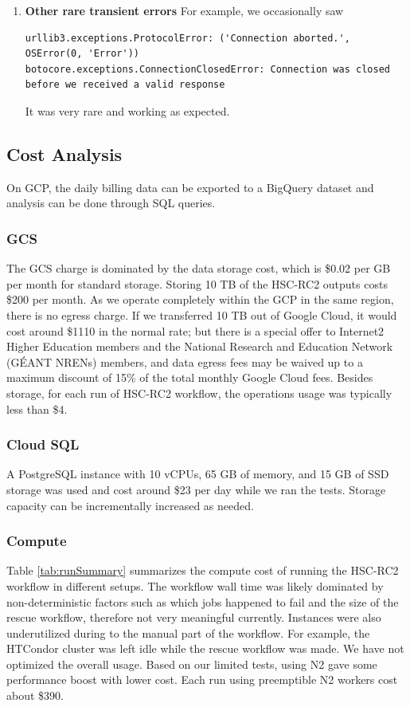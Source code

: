 \begin{enumerate}
\item  \textbf{Other rare transient errors}
For example, we occasionally saw
\begin{lstlisting}[style=basherror]
urllib3.exceptions.ProtocolError: ('Connection aborted.', OSError(0, 'Error'))
botocore.exceptions.ConnectionClosedError: Connection was closed before we received a valid response
\end{lstlisting}
It was very rare and working as expected.

\end{enumerate}


\subsection{Cost Analysis}
On GCP, the daily billing data can be exported to a BigQuery dataset and analysis can be done through SQL queries.

\subsubsection{GCS}
The GCS charge is dominated by the data storage cost, which is \$0.02 per GB per month for standard storage.
Storing 10 TB of the HSC-RC2 outputs costs \$200 per month.
As we operate completely within the GCP in the same region, there is no egress charge.
If we transferred 10 TB out of Google Cloud, it would cost around \$1110 in the normal rate; but there is a special offer to Internet2 Higher Education members and the National Research and Education Network (G\'{E}ANT NRENs) members, and data egress fees may be waived up to a maximum discount of 15\% of the total monthly Google Cloud fees.
Besides storage, for each run of HSC-RC2 workflow, the operations usage was typically less than \$4.

\subsubsection{Cloud SQL}
A PostgreSQL instance with 10 vCPUs, 65 GB of memory, and 15 GB of SSD storage was used and cost around \$23 per day while we ran the tests.
Storage capacity can be incrementally increased as needed.

\subsubsection{Compute}
Table \ref{tab:runSummary} summarizes the compute cost of running the HSC-RC2 workflow in different setups.
The workflow wall time was likely dominated by non-deterministic factors such as which jobs happened to fail and the size of the rescue workflow, therefore not very meaningful currently.
Instances were also underutilized during to the manual part of the workflow.
For example, the HTCondor cluster was left idle while the rescue workflow was made.
We have not optimized the overall usage.
Based on our limited tests, using N2 gave some performance boost with lower cost.
Each run using preemptible N2 workers cost about \$390.

